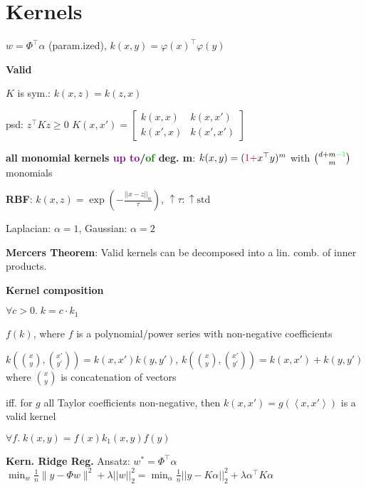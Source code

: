 \section*{Kernels}

$w = \Phi^\top \alpha$ (param.ized), $k(x,y) = \varphi(x)^\top \varphi(y)$


\textbf{Valid} ~ \begin{rowlist}
    \item $K$ is sym.: $k(x,z) = k(z,x)$
    \item psd: $z^\top K z \geq 0$
    $K(x, x') = \begin{bmatrix}
                k(x, x) & k(x, x') \\
                k(x', x) & k(x', x')
                \end{bmatrix}$   
\end{rowlist}

\textbf{all monomial kernels \textcolor{purple}{up to}/\textcolor{green}{of} deg. m}: $k(x,y) = (\textcolor{purple}{1 + }x^\top y)^m$ with $\binom{d+m\textcolor{green}{-1}}{m}$ monomials

\textbf{RBF}: $k(x, z) = \exp ( -\frac{||x - z||_\alpha}{\tau} )$, $\uparrow \tau : \uparrow \text{std}$

Laplacian: $\alpha = 1$, Gaussian: $\alpha = 2$ 


\textbf{Mercers Theorem}: Valid kernels can be decomposed into a lin. comb. of inner products.

\textbf{Kernel composition}

\begin{rowlist}
    \item $\forall c > 0. \; k = c \cdot k_1$
    \item $f(k)$, where $f$ is a polynomial/power series with non-negative coefficients
    \item{
        $k(\binom{x}{y}, \binom{x'}{y'})=k(x,x')k(y,y')$, $k(\binom{x}{y}, \binom{x'}{y'})=k(x,x') + k(y,y')$ where $\binom{x}{y}$ is concatenation of vectors
    }
    \item iff. for $g$ all Taylor coefficients non-negative, then $k(x, x') = g(\left< x, x' \right>)$ is a valid kernel
    \item $\forall f. \; k(x,y) = f(x)k_1(x,y)f(y)$
\end{rowlist}

\textbf{Kern. Ridge Reg.}
Ansatz: $w^*=\Phi^\top\alpha$\\
$\min_w \frac1n \|y - \Phi w\|^2 + \lambda ||w||_2^2 = \min_\alpha \frac1n ||y - K\alpha||_2^2 + \lambda \alpha^\top K \alpha$
